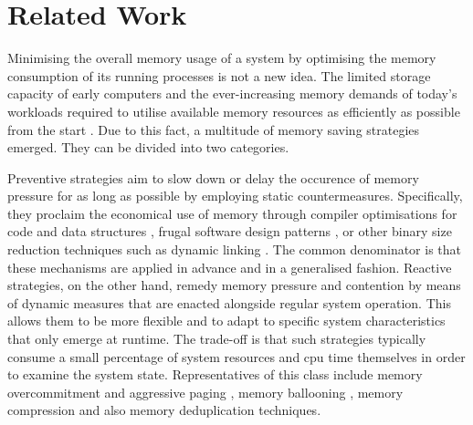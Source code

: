 \chapter{Related Work}
\label{chap:related-work}

Minimising the overall memory usage of a system by optimising the memory consumption of its running processes is not a new idea.
The limited storage capacity of early computers and the ever-increasing memory demands of today's workloads required to utilise available memory resources as efficiently as possible from the start \cite{memory-scarcity2015}.
Due to this fact, a multitude of memory saving strategies emerged.
They can be divided into two categories.

Preventive strategies aim to slow down or delay the occurence of memory pressure for as long as possible by employing static countermeasures.
Specifically, they proclaim the economical use of memory through compiler optimisations for code and data structures \cite{compiler-code-size2011}, frugal software design patterns \cite{small-software2000}, or other binary size reduction techniques such as dynamic linking \cite{osc2018}.
The common denominator is that these mechanisms are applied in advance and in a generalised fashion.
Reactive strategies, on the other hand, remedy memory pressure and contention by means of dynamic measures that are enacted alongside regular system operation.
This allows them to be more flexible and to adapt to specific system characteristics that only emerge at runtime.
The trade-off is that such strategies typically consume a small percentage of system resources and \ac{cpu} time themselves in order to examine the system state.
Representatives of this class include memory overcommitment and aggressive paging \cite{mos2009}, memory ballooning \cite{memory-ballooning2013}, memory compression \cite{osc2018} and also memory deduplication \cite{osc2018} techniques.

